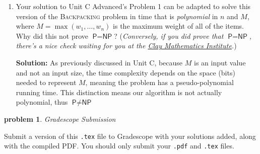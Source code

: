 \documentclass[10pt]{article}
\newcommand{\solution}[1]{\color{blue}\hfill\break\noindent\textbf{Solution:} #1\color{black}}
\newtheorem{problem}{\sc\color{cit}problem}
\begin{document}
\begin{enumerate}
  \item Your solution to Unit C Advanced's Problem 1 can be adapted to solve this version of the \textsc{Backpacking} problem
  in time that is {\em polynomial} in $n$ and $M$, where $M = \max(w_1, \ldots, w_n)$ is the maximum weight of all of the items. Why did this
  not prove $\textsf{P} = \textsf{NP}$? ({\em Conversely, if you did prove that $\textsf{P} = \textsf{NP}$, there's a nice
  check waiting for you at the \href{https://www.claymath.org/millennium-problems/p-vs-np-problem}{Clay Mathematics Institute}.})
  
  \solution
  {
  As previously discussed in Unit C, because $M$ is an input value and not an input size, the time complexity depends on the space (bits) needed to represent $M$, meaning the problem has a pseudo-polynomial running time. This distinction means our algorithm is not actually polynomial, thus $\textsf{P} \neq \textsf{NP}$
  }
\end{enumerate}


\begin{problem} Gradescope Submission \end{problem}
Submit a version of this \verb|.tex| file to Gradescope with your solutions added, along with the compiled PDF.  You should only submit your \verb|.pdf| and \verb|.tex| files.
\end{document}
